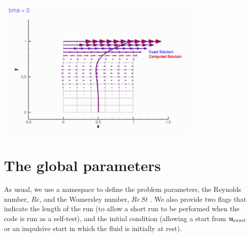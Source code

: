  
\begin{DoxyImage}
\includegraphics[width=0.75\textwidth]{velocity_vectors_TH}
\end{DoxyImage}




 

\hypertarget{index_namespace}{}\section{The global parameters}\label{index_namespace}
As usual, we use a namespace to define the problem parameters, the Reynolds number, $ Re$, and the Womersley number, $ Re\, St$ . We also provide two flags that indicate the length of the run (to allow a short run to be performed when the code is run as a self-\/test), and the initial condition (allowing a start from $ {\bf u}_{exact}$ or an impulsive start in which the fluid is initially at rest).

